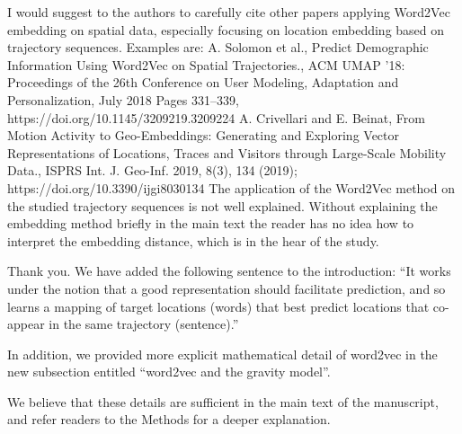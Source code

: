 \documentclass[12pt,a4paper]{article}
\newcommand{\response}[1]{{\leavevmode\noindent #1}}
\newcommand{\rcomment}[1]{%
\vspace{10pt}
\begin{tcolorbox}[colback=black!3,colframe=white!45!black]
#1
\end{tcolorbox}
}
\begin{document}
\rcomment{
I would suggest to the authors to carefully cite other papers applying Word2Vec embedding on spatial data, especially focusing on location embedding based on trajectory sequences. Examples are:
A. Solomon et al., Predict Demographic Information Using Word2Vec on Spatial Trajectories., ACM UMAP '18: Proceedings of the 26th Conference on User Modeling, Adaptation and Personalization, July 2018 Pages 331–339, https://doi.org/10.1145/3209219.3209224
A. Crivellari and E. Beinat, From Motion Activity to Geo-Embeddings: Generating and Exploring Vector Representations of Locations, Traces and Visitors through Large-Scale Mobility Data., ISPRS Int. J. Geo-Inf. 2019, 8(3), 134 (2019); https://doi.org/10.3390/ijgi8030134
The application of the Word2Vec method on the studied trajectory sequences is not well explained. Without explaining the embedding method briefly in the main text the reader has no idea how to interpret the embedding distance, which is in the hear of the study.

}

\response{
Thank you. We have added the following sentence to the introduction: “It works under the notion that a good representation should facilitate prediction, and so learns a mapping of target locations (words) that best predict locations that co-appear in the same trajectory (sentence).”

In addition, we provided more explicit mathematical detail of word2vec in the new subsection entitled “word2vec and the gravity model”. 

We believe that these details are sufficient in the main text of the manuscript, and refer readers to the Methods for a deeper explanation.
}
\end{document}
